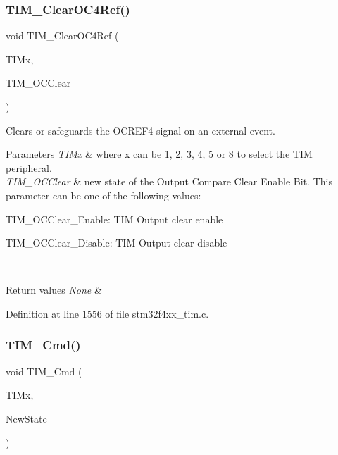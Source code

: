 \mbox{\label{group___t_i_m_gaeee5fa66b26e7c6f71850272dc3028f3}} 
\subsubsection{\texorpdfstring{T\+I\+M\+\_\+\+Clear\+O\+C4\+Ref()}{TIM\_ClearOC4Ref()}}
{\footnotesize\ttfamily void T\+I\+M\+\_\+\+Clear\+O\+C4\+Ref (\begin{DoxyParamCaption}\item[{\hyperlink{struct_t_i_m___type_def}{T\+I\+M\+\_\+\+Type\+Def} $\ast$}]{T\+I\+Mx,  }\item[{uint16\+\_\+t}]{T\+I\+M\+\_\+\+O\+C\+Clear }\end{DoxyParamCaption})}



Clears or safeguards the O\+C\+R\+E\+F4 signal on an external event. 


\begin{DoxyParams}{Parameters}
{\em T\+I\+Mx} & where x can be 1, 2, 3, 4, 5 or 8 to select the T\+IM peripheral. \\
\hline
{\em T\+I\+M\+\_\+\+O\+C\+Clear} & new state of the Output Compare Clear Enable Bit. This parameter can be one of the following values\+: \begin{DoxyItemize}
\item T\+I\+M\+\_\+\+O\+C\+Clear\+\_\+\+Enable\+: T\+IM Output clear enable \item T\+I\+M\+\_\+\+O\+C\+Clear\+\_\+\+Disable\+: T\+IM Output clear disable \end{DoxyItemize}
\\
\hline
\end{DoxyParams}

\begin{DoxyRetVals}{Return values}
{\em None} & \\
\hline
\end{DoxyRetVals}


Definition at line 1556 of file stm32f4xx\+\_\+tim.\+c.

\mbox{\label{group___t_i_m_ga2bdc275bcbd2ce9d1ba632e6c89896b7}} 
\subsubsection{\texorpdfstring{T\+I\+M\+\_\+\+Cmd()}{TIM\_Cmd()}}
{\footnotesize\ttfamily void T\+I\+M\+\_\+\+Cmd (\begin{DoxyParamCaption}\item[{\hyperlink{struct_t_i_m___type_def}{T\+I\+M\+\_\+\+Type\+Def} $\ast$}]{T\+I\+Mx,  }\item[{Functional\+State}]{New\+State }\end{DoxyParamCaption})}



